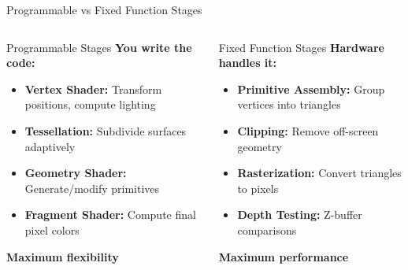 \begin{frame}{Programmable vs Fixed Function Stages}
  \begin{columns}
    \begin{column}{0.5\textwidth}
      \begin{raybox}{Programmable Stages}
        \textbf{You write the code:}
        \begin{itemize}
          \item \textbf{Vertex Shader:} Transform positions, compute lighting
          \item \textbf{Tessellation:} Subdivide surfaces adaptively
          \item \textbf{Geometry Shader:} Generate/modify primitives
          \item \textbf{Fragment Shader:} Compute final pixel colors
        \end{itemize}

        \vspace{0.2cm}
        \textcolor{PrimaryColor}{\textbf{Maximum flexibility}}
      \end{raybox}
    \end{column}
    \begin{column}{0.5\textwidth}
      \begin{conceptbox}{Fixed Function Stages}
        \textbf{Hardware handles it:}
        \begin{itemize}
          \item \textbf{Primitive Assembly:} Group vertices into triangles
          \item \textbf{Clipping:} Remove off-screen geometry
          \item \textbf{Rasterization:} Convert triangles to pixels
          \item \textbf{Depth Testing:} Z-buffer comparisons
        \end{itemize}

        \vspace{0.2cm}
        \textcolor{SecondaryColor}{\textbf{Maximum performance}}
      \end{conceptbox}
    \end{column}
  \end{columns}

  \pause
  \vspace{0.5cm}
  \begin{center}
  \end{center}
\end{frame}


